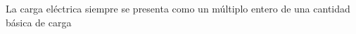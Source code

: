 \documentclass[preview]{standalone}
\begin{document}
La carga eléctrica siempre se presenta como un múltiplo
entero de una cantidad    básica de carga\\
\end{document}
